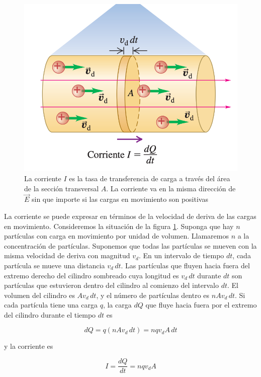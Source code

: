 \begin{figure}[h]
\centering
\includegraphics[scale=0.4]{fig/corriente}
\caption{La corriente $I$ es la tasa de transferencia de carga a través del área de la sección transversal $A$. La corriente va en la misma dirección de $\vec{E}$ sin que importe si las cargas en movimiento son positivas}
\label{fig:corriente}
\end{figure}

La corriente se puede expresar en términos de la velocidad de deriva de las cargas en movimiento. Consideremos la situación de la figura \ref{fig:corriente}. Suponga que hay $n$ partículas con carga en movimiento por unidad de volumen. Llamaremos $n$ a la concentración de partículas. Suponemos que todas las partículas se mueven con la misma velocidad de deriva con magnitud $v_d$. En un intervalo de tiempo $dt$, cada partícula se mueve una distancia $v_d\, dt$. Las partículas que fluyen hacia fuera del extremo derecho del cilindro sombreado cuya longitud es $v_d\, dt$ durante $dt$ son partículas que estuvieron dentro del cilindro al comienzo del intervalo $dt$. El volumen del cilindro es $Av_d\, dt$, y el número de partículas dentro es $nAv_d\, dt$. Si cada partícula tiene una carga $q$, la carga $dQ$ que fluye hacia fuera por el extremo del cilindro durante el tiempo $dt$ es

\begin{equation*}
dQ=q(nAv_d\, dt) = nqv_dA\, dt
\end{equation*}

y la corriente es

\begin{equation*}
I=\frac{dQ}{dt}=nqv_dA
\end{equation*}

